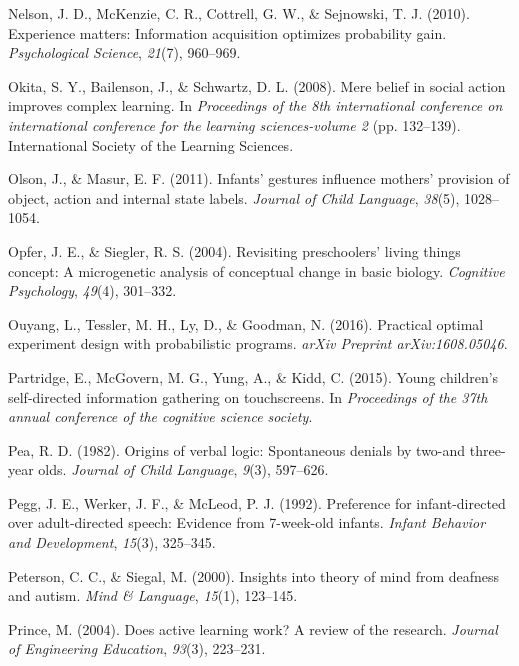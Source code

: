 \documentclass[english,floatsintext,man]{apa6}
\theoremstyle{definition}
\theoremstyle{definition}
\theoremstyle{definition}
\theoremstyle{remark}
\begin{document}
\hypertarget{ref-nelson2010experience}{}
Nelson, J. D., McKenzie, C. R., Cottrell, G. W., \& Sejnowski, T. J.
(2010). Experience matters: Information acquisition optimizes
probability gain. \emph{Psychological Science}, \emph{21}(7), 960--969.

\hypertarget{ref-okita2008mere}{}
Okita, S. Y., Bailenson, J., \& Schwartz, D. L. (2008). Mere belief in
social action improves complex learning. In \emph{Proceedings of the 8th
international conference on international conference for the learning
sciences-volume 2} (pp. 132--139). International Society of the Learning
Sciences.

\hypertarget{ref-olson2011infants}{}
Olson, J., \& Masur, E. F. (2011). Infants' gestures influence mothers'
provision of object, action and internal state labels. \emph{Journal of
Child Language}, \emph{38}(5), 1028--1054.

\hypertarget{ref-opfer2004revisiting}{}
Opfer, J. E., \& Siegler, R. S. (2004). Revisiting preschoolers' living
things concept: A microgenetic analysis of conceptual change in basic
biology. \emph{Cognitive Psychology}, \emph{49}(4), 301--332.

\hypertarget{ref-ouyang2016practical}{}
Ouyang, L., Tessler, M. H., Ly, D., \& Goodman, N. (2016). Practical
optimal experiment design with probabilistic programs. \emph{arXiv
Preprint arXiv:1608.05046}.

\hypertarget{ref-partridge2015young}{}
Partridge, E., McGovern, M. G., Yung, A., \& Kidd, C. (2015). Young
children's self-directed information gathering on touchscreens. In
\emph{Proceedings of the 37th annual conference of the cognitive science
society}.

\hypertarget{ref-pea1982origins}{}
Pea, R. D. (1982). Origins of verbal logic: Spontaneous denials by
two-and three-year olds. \emph{Journal of Child Language}, \emph{9}(3),
597--626.

\hypertarget{ref-pegg1992preference}{}
Pegg, J. E., Werker, J. F., \& McLeod, P. J. (1992). Preference for
infant-directed over adult-directed speech: Evidence from 7-week-old
infants. \emph{Infant Behavior and Development}, \emph{15}(3), 325--345.

\hypertarget{ref-peterson2000insights}{}
Peterson, C. C., \& Siegal, M. (2000). Insights into theory of mind from
deafness and autism. \emph{Mind \& Language}, \emph{15}(1), 123--145.

\hypertarget{ref-prince2004does}{}
Prince, M. (2004). Does active learning work? A review of the research.
\emph{Journal of Engineering Education}, \emph{93}(3), 223--231.
\end{document}
